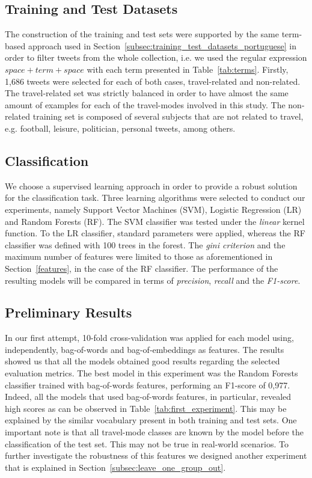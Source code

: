 \subsection{Training and Test Datasets}

The construction of the training and test sets were supported by the same term-based approach used in Section~\ref{subsec:training_test_datasets_portuguese} in order to filter tweets from the whole collection, i.e. we used the regular expression $space + term + space$ with each term presented in Table~\ref{tab:terms}. Firstly, 1,686 tweets were selected for each of both cases, travel-related and non-related. The travel-related set was strictly balanced in order to have almost the same amount of examples for each of the travel-modes involved in this study. The non-related training set is composed of several subjects that are not related to travel, e.g. football, leisure, politician, personal tweets, among others.

\subsection{Classification}
We choose a supervised learning approach in order to provide a robust solution for the classification task. Three learning algorithms were selected to conduct our experiments, namely Support Vector Machines (SVM), Logistic Regression (LR) and Random Forests (RF). The SVM classifier was tested under the \textit{linear} kernel function. To the LR classifier, standard parameters were applied, whereas the RF classifier was defined with 100 trees in the forest. The \textit{gini criterion} and the maximum number of features were limited to those as aforementioned in Section~\ref{features}, in the case of the RF classifier.
The performance of the resulting models will be compared in terms of \emph{precision}, \emph{recall} and the \emph{F1-score}.

\subsection{Preliminary Results}\label{subsec:preliminar_results}
In our first attempt, 10-fold cross-validation was applied for each model using, independently, bag-of-words and bag-of-embeddings as features. The results
showed us that all the models obtained good results regarding the selected evaluation metrics. The best model in this experiment was the Random Forests classifier trained with bag-of-words features, performing an F1-score of 0,977. Indeed, all the models that used bag-of-words features, in particular, revealed high scores as can be observed in Table~\ref{tab:first_experiment}. This may be explained by the similar vocabulary present in both training and test sets. One important note is that all travel-mode classes are known by the model before the classification of the test set. This may not be true in real-world scenarios. To further investigate the robustness of this features we designed another experiment that is explained in Section~\ref{subsec:leave_one_group_out}.

